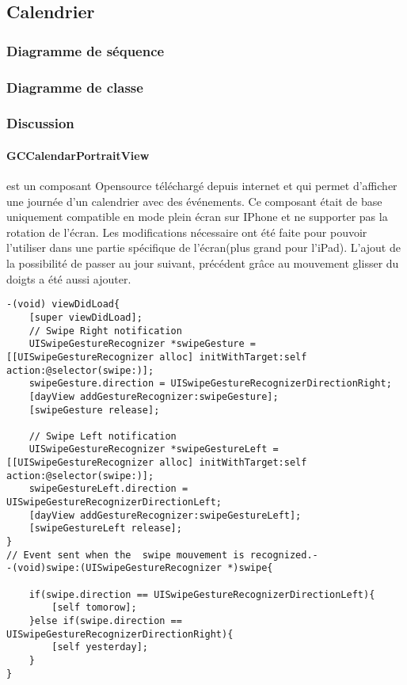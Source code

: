 	\subsection{Calendrier}
					\subsubsection*{Diagramme de séquence}

					\subsubsection*{Diagramme de classe}
						 	
					\subsubsection*{Discussion}
					\paragraph{GCCalendarPortraitView} est un composant Opensource téléchargé depuis internet et qui permet d'afficher une journée d'un calendrier avec des événements. Ce composant était de base uniquement compatible en mode plein écran sur IPhone et ne supporter pas la rotation de l'écran. Les modifications nécessaire ont été faite pour pouvoir l'utiliser dans une partie spécifique de l'écran(plus grand pour l'iPad). L'ajout de la possibilité de passer au jour suivant, précédent grâce au mouvement glisser du doigts a été aussi ajouter. 
\lstset{
		style = Xcode,
		caption=Enregistrement pour les notifications du mouvement glissement du doigt et réception de l'événement ,
		breaklines=true,
		frame=single
}
				
\begin{lstlisting}[name=Recherche dans UITableView  , label=searchTBV]
-(void) viewDidLoad{
    [super viewDidLoad];
    // Swipe Right notification
    UISwipeGestureRecognizer *swipeGesture = [[UISwipeGestureRecognizer alloc] initWithTarget:self action:@selector(swipe:)];
    swipeGesture.direction = UISwipeGestureRecognizerDirectionRight;
    [dayView addGestureRecognizer:swipeGesture];
    [swipeGesture release];
    
    // Swipe Left notification
    UISwipeGestureRecognizer *swipeGestureLeft = [[UISwipeGestureRecognizer alloc] initWithTarget:self action:@selector(swipe:)];
    swipeGestureLeft.direction = UISwipeGestureRecognizerDirectionLeft;
    [dayView addGestureRecognizer:swipeGestureLeft];
    [swipeGestureLeft release];
}
// Event sent when the  swipe mouvement is recognized.-
-(void)swipe:(UISwipeGestureRecognizer *)swipe{
    
    if(swipe.direction == UISwipeGestureRecognizerDirectionLeft){
        [self tomorow];
    }else if(swipe.direction == UISwipeGestureRecognizerDirectionRight){
        [self yesterday];   
    }
}
\end{lstlisting}
